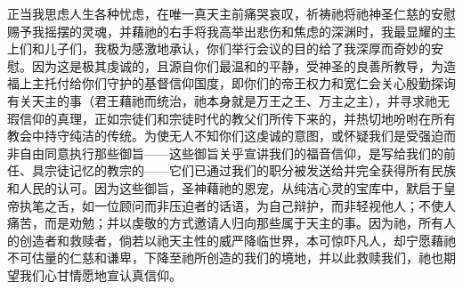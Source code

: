\par

\par

正当我思虑人生各种忧虑，在唯一真天主前痛哭哀叹，祈祷祂将祂神圣仁慈的安慰赐予我摇摆的灵魂，并藉祂的右手将我高举出悲伤和焦虑的深渊时，我最显耀的主上们和儿子们，我极为感激地承认，你们举行会议的目的给了我深厚而奇妙的安慰。因为这是极其虔诚的，且源自你们最温和的平静，受神圣的良善所教导，为造福上主托付给你们守护的基督信仰国度，即你们的帝王权力和宽仁会关心殷勤探询有关天主的事（君王藉祂而统治，祂本身就是万王之王、万主之主），并寻求祂无瑕信仰的真理，正如宗徒们和宗徒时代的教父们所传下来的，并热切地吩咐在所有教会中持守纯洁的传统。为使无人不知你们这虔诚的意图，或怀疑我们是受强迫而非自由同意执行那些御旨——这些御旨关乎宣讲我们的福音信仰，是写给我们的前任、具宗徒记忆的教宗的——它们已通过我们的职分被发送给并完全获得所有民族和人民的认可。因为这些御旨，圣神藉祂的恩宠，从纯洁心灵的宝库中，默启于皇帝执笔之舌，如一位顾问而非压迫者的话语，为自己辩护，而非轻视他人；不使人痛苦，而是劝勉；并以虔敬的方式邀请人归向那些属于天主的事。因为祂，所有人的创造者和救赎者，倘若以祂天主性的威严降临世界，本可惊吓凡人，却宁愿藉祂不可估量的仁慈和谦卑，下降至祂所创造的我们的境地，并以此救赎我们，祂也期望我们心甘情愿地宣认真信仰。\par

